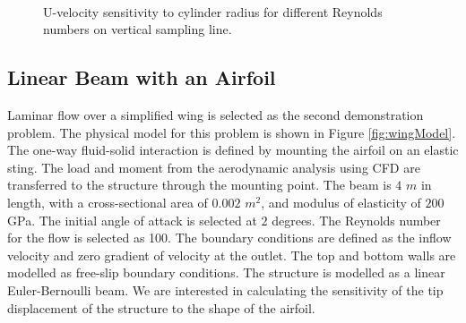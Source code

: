 \documentclass[12pt]{aiaa-pretty}
\begin{document}
\begin{figure}[H]
{	}
	\quad
	\\
	\quad
	\caption{U-velocity sensitivity to cylinder radius for different Reynolds numbers on vertical sampling line.}
	\label{fig:cylinderVelocitySensitivity}
\end{figure}
%

\subsection{Linear Beam with an Airfoil}
Laminar flow over a simplified wing is selected as the second demonstration problem. The physical model for this problem is shown in Figure \ref{fig:wingModel}. The one-way fluid-solid interaction is defined by mounting the airfoil on an elastic sting. The load and moment from the aerodynamic analysis using CFD are transferred to the structure through the mounting point. The beam is $4$ $m$ in length, with a cross-sectional area of $0.002$ $m^2$, and modulus of elasticity of $200$ GPa. The initial angle of attack is selected at $2$ degrees. The Reynolds number for the flow is selected as 100. The boundary conditions are defined as the inflow velocity and zero gradient of velocity at the outlet. The top and bottom walls are modelled as free-slip boundary conditions. The structure is modelled as a linear Euler-Bernoulli beam. We are interested in calculating the sensitivity of the tip displacement of the structure to the shape of the airfoil.
\end{document}
